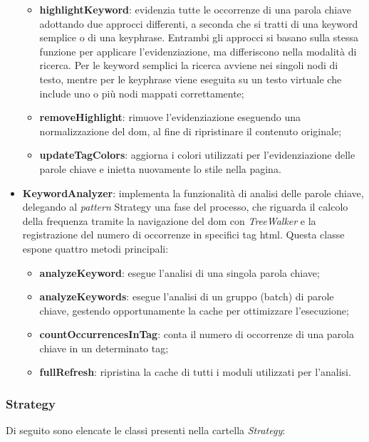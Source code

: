 \begin{itemize}
\begin{itemize}
    \item \textbf{highlightKeyword}: evidenzia tutte le occorrenze di una parola chiave adottando due approcci differenti, a seconda che si tratti di una keyword semplice o di una keyphrase. Entrambi gli approcci si basano sulla stessa funzione per applicare l’evidenziazione, ma differiscono nella modalità di ricerca. Per le keyword semplici la ricerca avviene nei singoli nodi di testo, mentre per le keyphrase viene eseguita su un testo virtuale che include uno o più nodi mappati correttamente;
    \item \textbf{removeHighlight}: rimuove l’evidenziazione eseguendo una normalizzazione del \gls{dom}, al fine di ripristinare il contenuto originale;
    \item \textbf{updateTagColors}: aggiorna i colori utilizzati per l’evidenziazione delle parole chiave e inietta nuovamente lo stile nella pagina.
  \end{itemize}
  \item \textbf{KeywordAnalyzer}: implementa la funzionalità di analisi delle parole chiave, delegando al \textit{pattern} Strategy una fase del processo, che riguarda il calcolo della frequenza tramite la navigazione del \gls{dom} con \textit{TreeWalker} e la registrazione del numero di occorrenze in specifici tag \gls{html}. Questa classe espone quattro metodi principali:
  \begin{itemize}
    \item \textbf{analyzeKeyword}: esegue l’analisi di una singola parola chiave;
    \item \textbf{analyzeKeywords}: esegue l’analisi di un gruppo (batch) di parole chiave, gestendo opportunamente la cache per ottimizzare l’esecuzione;
    \item \textbf{countOccurrencesInTag}: conta il numero di occorrenze di una parola chiave in un determinato tag;
    \item \textbf{fullRefresh}: ripristina la cache di tutti i moduli utilizzati per l’analisi.
  \end{itemize}
\end{itemize}

\subsubsection{Strategy}

Di seguito sono elencate le classi presenti nella cartella \textit{Strategy}:


